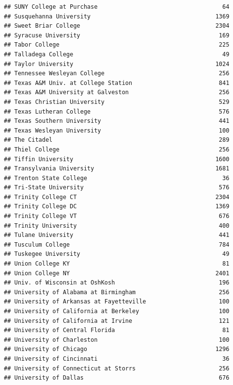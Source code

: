 \documentclass[
]{article}
\begin{document}
\begin{verbatim}
## SUNY College at Purchase                                    64
## Susquehanna University                                    1369
## Sweet Briar College                                       2304
## Syracuse University                                        169
## Tabor College                                              225
## Talladega College                                           49
## Taylor University                                         1024
## Tennessee Wesleyan College                                 256
## Texas A&M Univ. at College Station                         841
## Texas A&M University at Galveston                          256
## Texas Christian University                                 529
## Texas Lutheran College                                     576
## Texas Southern University                                  441
## Texas Wesleyan University                                  100
## The Citadel                                                289
## Thiel College                                              256
## Tiffin University                                         1600
## Transylvania University                                   1681
## Trenton State College                                       36
## Tri-State University                                       576
## Trinity College CT                                        2304
## Trinity College DC                                        1369
## Trinity College VT                                         676
## Trinity University                                         400
## Tulane University                                          441
## Tusculum College                                           784
## Tuskegee University                                         49
## Union College KY                                            81
## Union College NY                                          2401
## Univ. of Wisconsin at OshKosh                              196
## University of Alabama at Birmingham                        256
## University of Arkansas at Fayetteville                     100
## University of California at Berkeley                       100
## University of California at Irvine                         121
## University of Central Florida                               81
## University of Charleston                                   100
## University of Chicago                                     1296
## University of Cincinnati                                    36
## University of Connecticut at Storrs                        256
## University of Dallas                                       676

\end{verbatim}
\end{document}
